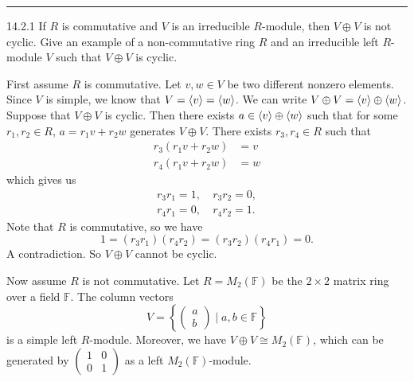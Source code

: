 \documentclass[a4paper, 12pt]{article}
\begin{document}
\noindent\rule{7in}{2.8pt}
\begin{problem}{14.2.1}
If \(R\) is commutative and \(V\) is an irreducible \(R\)-module, then \(V\oplus V\) is not cyclic. Give an example of a non-commutative ring \(R\) and an irreducible left \(R\)-module \(V\) such that 
\(V\oplus V\) is cyclic.
\end{problem}
\begin{solution}
First assume \(R\) is commutative. Let \(v,w\in V\) be two different nonzero elements. Since \(V\) is simple, we know that \(V=\langle v\rangle=\langle w\rangle\). We can write \(V\oplus V=\langle v\rangle\oplus \langle w\rangle\). Suppose that \(V\oplus V\) is cyclic. Then there exists \(a\in \langle v\rangle\oplus \langle w\rangle\) such 
that for some \(r_1,r_2\in R\), \(a=r_1v+r_2w\) generates \(V\oplus V\). There exists \(r_3,r_4\in R\) such that 
\begin{align*}
    r_3(r_1v+r_2w)&=v\\ 
    r_4(r_1v+r_2w)&=w
\end{align*}
which gives us 
\begin{align*}
    r_3r_1=1,&\ r_3r_2=0,\\
    r_4r_1=0,&\ r_4r_2=1. 
\end{align*}
Note that \(R\) is commutative, so we have 
\[1=(r_3r_1)(r_4r_2)=(r_3r_2)(r_4r_1)=0.\]
A contradiction. So \(V\oplus V\) cannot be cyclic. 

Now assume \(R\) is not commutative. Let \(R=M_2(\mathbb{F})\) be the \(2\times 2\) matrix ring over a field \(\mathbb{F}\). The column vectors 
\[V=\left\{ \begin{pmatrix}
a\\ 
b
\end{pmatrix}\mid a,b\in \mathbb{F} \right\}\]
is a simple left \(R\)-module. Moreover, we have \(V\oplus V\cong M_2(\mathbb{F})\), which can be generated by \(\begin{pmatrix}
    1&0\\
    0&1
\end{pmatrix}\) as a left \(M_2(\mathbb{F})\)-module.
\end{solution}
\end{document}
